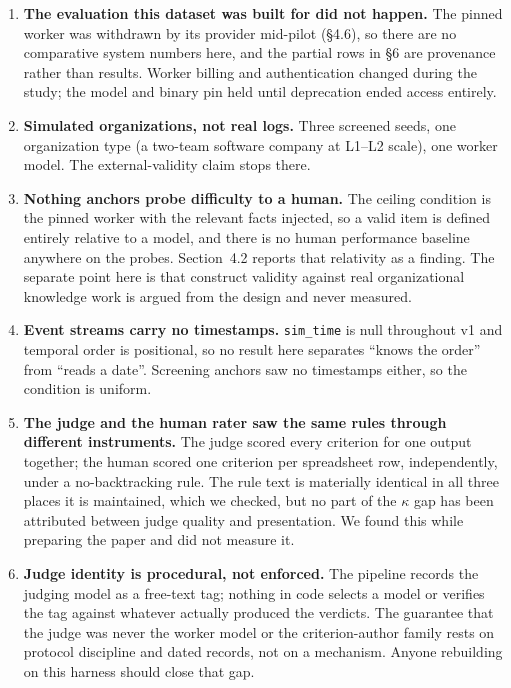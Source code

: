 \documentclass[11pt]{article}
\newcommand{\code}[1]{\texttt{\small #1}}
\begin{document}
\begin{enumerate}[leftmargin=*, itemsep=.3em]
\item \textbf{The evaluation this dataset was built for did not happen.} The
pinned worker was withdrawn by its provider mid-pilot (\S4.6), so there are no
comparative system numbers here, and the partial rows in \S6 are provenance rather
than results. Worker billing and authentication changed during the study; the
model and binary pin held until deprecation ended access entirely.

\item \textbf{Simulated organizations, not real logs.} Three screened seeds, one
organization type (a two-team software company at L1--L2 scale), one worker model.
The external-validity claim stops there.

\item \textbf{Nothing anchors probe difficulty to a human.} The ceiling condition
is the pinned worker with the relevant facts injected, so a valid item is defined
entirely relative to a model, and there is no human performance baseline anywhere
on the probes. Section~4.2 reports that relativity as a finding. The separate
point here is that construct validity against real organizational knowledge work
is argued from the design and never measured.

\item \textbf{Event streams carry no timestamps.} \code{sim\_time} is null
throughout v1 and temporal order is positional, so no result here separates
``knows the order'' from ``reads a date''. Screening anchors saw no timestamps
either, so the condition is uniform.

\item \textbf{The judge and the human rater saw the same rules through different
instruments.} The judge scored every criterion for one output together; the human
scored one criterion per spreadsheet row, independently, under a no-backtracking
rule. The rule text is materially identical in all three places it is maintained,
which we checked, but no part of the $\kappa$ gap has been attributed between
judge quality and presentation. We found this while preparing the paper and did
not measure it.

\item \textbf{Judge identity is procedural, not enforced.} The pipeline records
the judging model as a free-text tag; nothing in code selects a model or verifies
the tag against whatever actually produced the verdicts. The guarantee that the
judge was never the worker model or the criterion-author family rests on protocol
discipline and dated records, not on a mechanism. Anyone rebuilding on this
harness should close that gap.


\end{enumerate}
\end{document}
